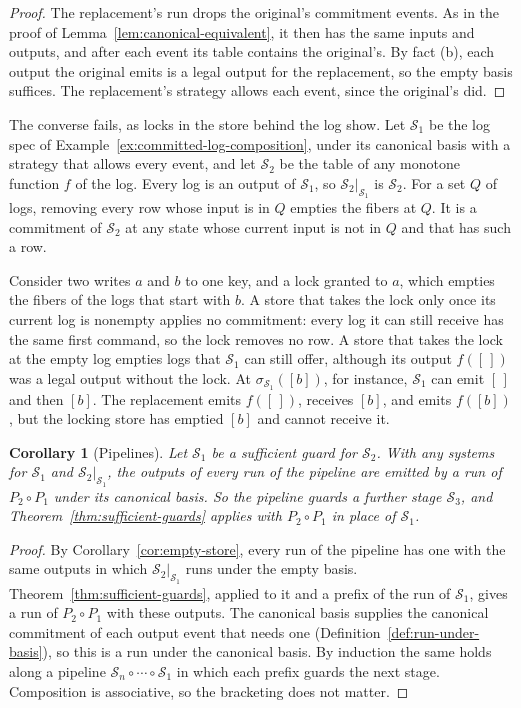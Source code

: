\documentclass[sigconf]{cidr-2027}
\newtheorem{corollary}{Corollary}
\theoremstyle{remark}
\newcommand{\commitment}{commitment\xspace}
\newcommand{\Spec}{\mathcal{S}}
\begin{document}
\begin{proof}
The replacement's run drops the original's \commitment events. As in the
proof of Lemma~\ref{lem:canonical-equivalent}, it then has the same inputs and
outputs, and after each event its table contains the original's. By fact
(b), each output the original emits is a legal output for the replacement, so
the empty basis suffices. The replacement's strategy allows each event,
since the original's did.
\end{proof}

The converse fails, as locks in the store behind the log show. Let
$\Spec_1$ be the log spec of Example~\ref{ex:committed-log-composition}, under
its canonical basis with a strategy that allows every event, and let
$\Spec_2$ be the table of any monotone function $f$ of the log. Every log is
an output of $\Spec_1$, so $\Spec_2|_{\Spec_1}$ is $\Spec_2$. For a set $Q$
of logs, removing every row whose input is in $Q$ empties the fibers at $Q$. It is a \commitment of $\Spec_2$ at any state whose current input is not in
$Q$ and that has such a row.

Consider two writes $a$ and $b$ to one key, and a lock granted to $a$, which
empties the fibers of the logs that start with $b$. A store that takes the
lock only once its current log is nonempty applies no \commitment: every log
it can still receive has the same first command, so the lock removes no row. A store that takes the lock at the empty log empties logs that $\Spec_1$ can
still offer, although its output $f([\,])$ was a legal output without the
lock. At $\sigma_{\Spec_1}([b])$, for instance, $\Spec_1$ can emit $[\,]$ and
then $[b]$. The replacement emits $f([\,])$, receives $[b]$, and emits
$f([b])$, but the locking store has emptied $[b]$ and cannot receive it.

\begin{corollary}[Pipelines]
\label{cor:pipelines}
Let $\Spec_1$ be a sufficient guard for $\Spec_2$. With any systems for $\Spec_1$ and
$\Spec_2|_{\Spec_1}$, the outputs of every run of the pipeline are emitted by
a run of $P_2\circ P_1$ under its canonical basis. So the pipeline guards a
further stage $\Spec_3$, and Theorem~\ref{thm:sufficient-guards} applies
with $P_2\circ P_1$ in place of $\Spec_1$.
\end{corollary}

\begin{proof}
By Corollary~\ref{cor:empty-store}, every run of the pipeline has one with the
same outputs in which $\Spec_2|_{\Spec_1}$ runs under the empty basis. Theorem~\ref{thm:sufficient-guards}, applied to it and a prefix of the
run of $\Spec_1$, gives a run of $P_2\circ P_1$ with these outputs. The
canonical basis supplies the canonical \commitment of each output event that
needs one (Definition~\ref{def:run-under-basis}), so this is a run under the
canonical basis. By induction the same holds along a pipeline
$\Spec_n\circ\cdots\circ\Spec_1$ in which each prefix guards the next
stage. Composition is associative, so the bracketing does not matter.
\end{proof}
\end{document}
